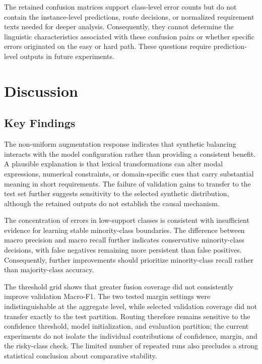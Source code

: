 \documentclass[runningheads]{llncs}
\begin{document}
The retained confusion matrices support class-level error counts but do not contain the instance-level predictions, route decisions, or normalized requirement texts needed for deeper analysis. Consequently, they cannot determine the linguistic characteristics associated with these confusion pairs or whether specific errors originated on the easy or hard path. These questions require prediction-level outputs in future experiments.

\section{Discussion}\label{sec:discussion}

\subsection{Key Findings}\label{sec:key-findings}

The non-uniform augmentation response indicates that synthetic balancing interacts with the model configuration rather than providing a consistent benefit. A plausible explanation is that lexical transformations can alter modal expressions, numerical constraints, or domain-specific cues that carry substantial meaning in short requirements. The failure of validation gains to transfer to the test set further suggests sensitivity to the selected synthetic distribution, although the retained outputs do not establish the causal mechanism.

The concentration of errors in low-support classes is consistent with insufficient evidence for learning stable minority-class boundaries. The difference between macro precision and macro recall further indicates conservative minority-class decisions, with false negatives remaining more persistent than false positives. Consequently, further improvements should prioritize minority-class recall rather than majority-class accuracy.

The threshold grid shows that greater fusion coverage did not consistently improve validation Macro-F1. The two tested margin settings were indistinguishable at the aggregate level, while selected validation coverage did not transfer exactly to the test partition. Routing therefore remains sensitive to the confidence threshold, model initialization, and evaluation partition; the current experiments do not isolate the individual contributions of confidence, margin, and the risky-class check. The limited number of repeated runs also precludes a strong statistical conclusion about comparative stability.
\end{document}

